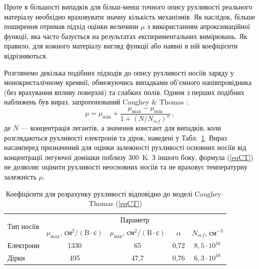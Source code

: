 \documentclass[12pt,a4paper,titlepage,oneside]{book}
\numberwithin{equation}{part}
\begin{document}
Проте в більшості випадків для більш-менш точного опису рухливості реального матеріалу необхідно враховувати значну кількість механізмів.
Як наслідок, більше поширення отримав підхід оцінки величини $\mu$ з використанням апроксимаційної функції, яка часто базується на результатах експериментальних вимірювань.
Як правило, для кожного матеріалу вигляд функції або наявні в ній коефіцієнти відрізняються.

Розглянемо декілька подібних підходів до опису рухливості носіїв заряду у монокристалічному кремнії, обмежуючись випадками об'ємного напівпровідника
(без врахування впливу поверхні) та слабких полів.
Одним з перших подібних наближень був вираз, запропонований   Caughey \& Thomas \cite{Caughey1967}:
\begin{equation}\label{eqCT}
  \mu=\mu_\mathrm{min}+\frac{\mu_\mathrm{max}-\mu_\mathrm{min}}{1+(N/N_{ref})^\alpha}\,,
\end{equation}
де
$N$ --- концентрація легантів,
а значення констант для випадків, коли розглядаються рухливості електронів та дірок, наведені у Табл.~\ref{tblCT}.
Вираз насамперед призначений для оцінки залежності рухливості основних носіїв від концентрації легуючої домішки поблизу 300~K.
З іншого боку, формула (\ref{eqCT}) не дозволяє оцінити рухливості неосновних носіїв та не враховує температурну залежність $\mu$.


\begin{table}
\caption{Коефіцієнти для розрахунку рухливості відповідно до моделі Caughey--Thomas (\ref{eqCT})}
\label{tblCT}
\centering
\begin{tabular}{|l|c|c|c|c|}
\hline
\multirow{2}{*}{Тип носіїв} & \multicolumn{4}{c|}{Параметр} \\
\cline{2-5}
&$\mu_\mathrm{max}$, $\text{см}^2/(\text{B}\cdot\text{с})$&$\mu_\mathrm{min}$, $\text{см}^2/(\text{B}\cdot\text{с})$&$\alpha$&$N_{ref}$, см$^{-3}$ \rule{0pt}{13pt}\\
\hline
Електрони&1330&65&0,72&$8,5\cdot10^{16}$\\
Дірки&495&47,7&0,76&$6,3\cdot10^{16}$\\
\hline
\end{tabular}
\end{table}
\end{document}
